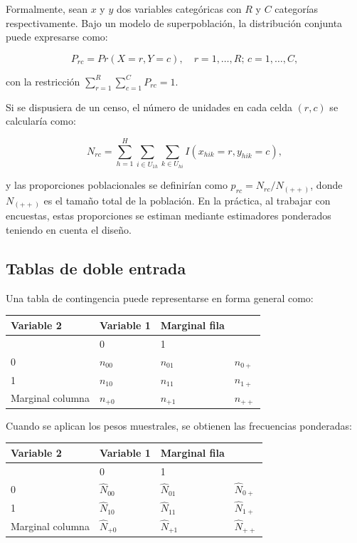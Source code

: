 \documentclass[
  spanish,
  12pt,
]{book}
\newcounter{none} %
\begin{document}
Formalmente, sean \(x\) y \(y\) dos variables categóricas con \(R\) y \(C\) categorías respectivamente. Bajo un modelo de superpoblación, la distribución conjunta puede expresarse como:

\[
P_{rc} = Pr(X=r, Y=c), \quad r=1,\dots,R;\, c=1,\dots,C,
\]

con la restricción \(\sum_{r=1}^{R}\sum_{c=1}^{C} P_{rc}=1\).

Si se dispusiera de un censo, el número de unidades en cada celda \((r,c)\) se calcularía como:

\[
N_{rc} = \sum_{h=1}^{H} \sum_{i \in U_{1h}} \sum_{k \in U_{hi}} I(x_{hik}=r, y_{hik}=c), 
\]

y las proporciones poblacionales se definirían como \(p_{rc} = N_{rc}/N_{(++)}\), donde \(N_{(++)}\) es el tamaño total de la población. En la práctica, al trabajar con encuestas, estas proporciones se estiman mediante estimadores ponderados teniendo en cuenta el diseño.

\subsection{Tablas de doble entrada}\label{tablas-de-doble-entrada}

Una tabla de contingencia puede representarse en forma general como:

{\def\LTcaptype{none} %
\begin{longtable}[]{@{}llll@{}}
\toprule\noalign{}
Variable 2 & Variable 1 & Marginal fila & \\
\midrule\noalign{}
\endhead
\bottomrule\noalign{}
\endlastfoot
& 0 & 1 & \\
0 & \(n_{00}\) & \(n_{01}\) & \(n_{0+}\) \\
1 & \(n_{10}\) & \(n_{11}\) & \(n_{1+}\) \\
Marginal columna & \(n_{+0}\) & \(n_{+1}\) & \(n_{++}\) \\
\end{longtable}
}

Cuando se aplican los pesos muestrales, se obtienen las frecuencias ponderadas:

{\def\LTcaptype{none} %
\begin{longtable}[]{@{}llll@{}}
\toprule\noalign{}
Variable 2 & Variable 1 & Marginal fila & \\
\midrule\noalign{}
\endhead
\bottomrule\noalign{}
\endlastfoot
& 0 & 1 & \\
0 & \(\hat{N}_{00}\) & \(\hat{N}_{01}\) & \(\hat{N}_{0+}\) \\
1 & \(\hat{N}_{10}\) & \(\hat{N}_{11}\) & \(\hat{N}_{1+}\) \\
Marginal columna & \(\hat{N}_{+0}\) & \(\hat{N}_{+1}\) & \(\hat{N}_{++}\) \\
\end{longtable}
}
\end{document}
